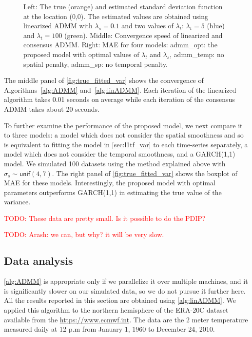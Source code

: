 \documentclass{article}
\newcommand{\attn}[1]{\textcolor{red}{TODO: #1}}
\begin{document}
\begin{figure}[tb]
  \caption{Left: The true (orange) and estimated standard deviation 
    function at the location (0,0). The estimated values are
    obtained using linearized ADMM with $\lambda_s=0.1$ and two
    values of $\lambda_t$: $\lambda_t=5$ (blue) and
    $\lambda_t=100$ (green). Middle: Convergence speed of linearized and consensus ADMM. Right: MAE for four models: admm\_opt: the proposed model with optimal values of $\lambda_t$ and $\lambda_s$, admm\_temp: no spatial penalty, admm\_sp: no temporal penalty.} \label{fig:true_fitted_var}
\end{figure}

The middle panel of \autoref{fig:true_fitted_var} shows the convergence of Algorithms~\ref{alg:ADMM} and~\ref{alg:linADMM}. Each iteration of the linearized algorithm takes 0.01 seconds on average while each iteration of the consensus ADMM takes about 20 seconds.

To further examine the performance of the proposed model, we next compare it to three models: a model which does not consider the spatial smoothness and so is equivalent to fitting the model in \autoref{sec:l1tf_var} to each time-series separately, a model which does not consider the temporal smoothness, and a GARCH(1,1) model. We simulated 100 datasets using the method explained above with $\sigma_s \sim \mathsf{unif}(4,7)$. The right panel of \autoref{fig:true_fitted_var} shows the boxplot of MAE for these models. Interestingly, the proposed model with optimal parameters outperforms GARCH(1,1) in estimating the true value of the variance.   



\attn{These data are pretty small. Is it possible to do the PDIP?}

\attn{Arash: we can, but why? it will be very slow.}


\subsection{Data analysis}
\label{sec:data}

\autoref{alg:ADMM} is appropriate only if
we parallelize it over multiple machines, and it is significantly
slower on our simulated data, so we do not pursue it
further here. All the results reported in this section are obtained
using \autoref{alg:linADMM}. We
applied this algorithm to the northern hemisphere of the ERA-20C
dataset available from the \href{European Center for Medium-Range
  Weather Forecasts}{https://www.ecmwf.int}. The data are
the 2 meter temperature measured daily at 12 p.m from January 1, 1960
to December 24, 2010. 
\end{document}
